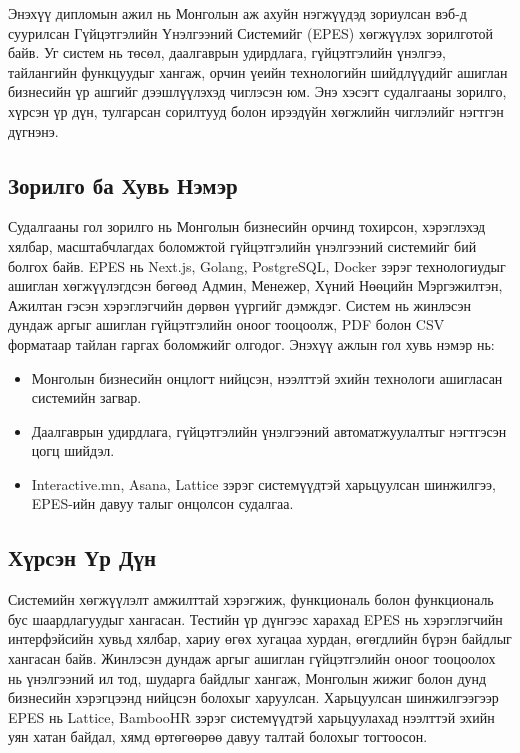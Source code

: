 Энэхүү дипломын ажил нь Монголын аж ахуйн нэгжүүдэд зориулсан вэб-д суурилсан Гүйцэтгэлийн Үнэлгээний Системийг (EPES) хөгжүүлэх зорилготой байв. Уг систем нь төсөл, даалгаврын удирдлага, гүйцэтгэлийн үнэлгээ, тайлангийн функцуудыг хангаж, орчин үеийн технологийн шийдлүүдийг ашиглан бизнесийн үр ашгийг дээшлүүлэхэд чиглэсэн юм. Энэ хэсэгт судалгааны зорилго, хүрсэн үр дүн, тулгарсан сорилтууд болон ирээдүйн хөгжлийн чиглэлийг нэгтгэн дүгнэнэ.

\subsection{Зорилго ба Хувь Нэмэр}
Судалгааны гол зорилго нь Монголын бизнесийн орчинд тохирсон, хэрэглэхэд хялбар, масштабчлагдах боломжтой гүйцэтгэлийн үнэлгээний системийг бий болгох байв. EPES нь Next.js, Golang, PostgreSQL, Docker зэрэг технологиудыг ашиглан хөгжүүлэгдсэн бөгөөд Админ, Менежер, Хүний Нөөцийн Мэргэжилтэн, Ажилтан гэсэн хэрэглэгчийн дөрвөн үүргийг дэмждэг. Систем нь жинлэсэн дундаж аргыг ашиглан гүйцэтгэлийн оноог тооцоолж, PDF болон CSV форматаар тайлан гаргах боломжийг олгодог. Энэхүү ажлын гол хувь нэмэр нь:
\begin{itemize}
    \item Монголын бизнесийн онцлогт нийцсэн, нээлттэй эхийн технологи ашигласан системийн загвар.
    \item Даалгаврын удирдлага, гүйцэтгэлийн үнэлгээний автоматжуулалтыг нэгтгэсэн цогц шийдэл.
    \item Interactive.mn, Asana, Lattice зэрэг системүүдтэй харьцуулсан шинжилгээ, EPES-ийн давуу талыг онцолсон судалгаа.
\end{itemize}

\subsection{Хүрсэн Үр Дүн}
Системийн хөгжүүлэлт амжилттай хэрэгжиж, функциональ болон функциональ бус шаардлагуудыг хангасан. Тестийн үр дүнгээс харахад EPES нь хэрэглэгчийн интерфэйсийн хувьд хялбар, хариу өгөх хугацаа хурдан, өгөгдлийн бүрэн байдлыг хангасан байв. Жинлэсэн дундаж аргыг ашиглан гүйцэтгэлийн оноог тооцоолох нь үнэлгээний ил тод, шударга байдлыг хангаж, Монголын жижиг болон дунд бизнесийн хэрэгцээнд нийцсэн болохыг харуулсан. Харьцуулсан шинжилгээгээр EPES нь Lattice, BambooHR зэрэг системүүдтэй харьцуулахад нээлттэй эхийн уян хатан байдал, хямд өртөгөөрөө давуу талтай болохыг тогтоосон.

